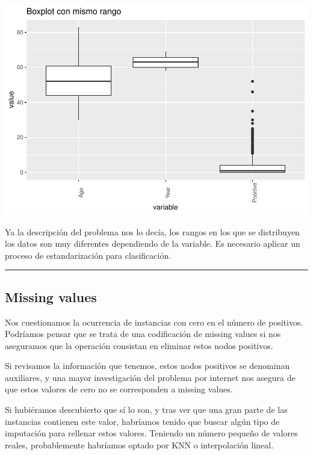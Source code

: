\documentclass[
]{article}
\begin{document}
\begin{center}\includegraphics{EDA2_files/figure-latex/unnamed-chunk-12-1} \end{center}

Ya la descripción del problema nos lo decía, los rangos en los que se
distribuyen los datos son muy diferentes dependiendo de la variable. Es
necesario aplicar un proceso de estandarización para clasificación.

\begin{center}\rule{0.5\linewidth}{0.5pt}\end{center}

\hypertarget{missing-values}{%
\subsection{Missing values}\label{missing-values}}

Nos cuestionamos la ocurrencia de instancias con cero en el número de
positivos. Podríamos pensar que se trata de una codificación de missing
values si nos aseguramos que la operación consistan en eliminar estos
nodos positivos.

Si revisamos la información que tenemos, estos nodos positivos se
denominan auxiliares, y una mayor investigación del problema por
internet nos asegura de que estos valores de cero no se corresponden a
missing values.

Si hubiéramos descubierto que sí lo son, y tras ver que una gran parte
de las instancias contienen este valor, habríamos tenido que buscar
algún tipo de imputación para rellenar estos valores. Teniendo un número
pequeño de valores reales, probablemente habríamos optado por KNN o
interpolación lineal.
\end{document}

